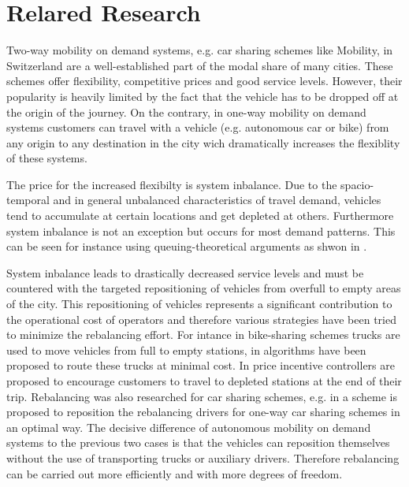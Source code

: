 \section{Relared Research}
\label{subs:literatureResearch}

Two-way mobility on demand systems, e.g. car sharing schemes like Mobility, in
Switzerland \citep{katzev2003car} are a well-established part of the modal share
of many cities. These schemes offer flexibility, competitive prices and good
service levels. However, their popularity is heavily limited by the fact that
the vehicle has to be dropped off at the origin of the journey. On the contrary,
in one-way mobility on demand systems customers can travel with a vehicle (e.g.
autonomous car or bike) from any origin to any destination in the city wich
dramatically increases the flexiblity of these systems.

The price for the increased flexibilty is system inbalance. Due to the
spacio-temporal and in general unbalanced characteristics of travel demand,
vehicles tend to accumulate at certain locations and get depleted at others.
Furthermore system inbalance is not an exception but occurs for most demand
patterns. This can be seen for instance using queuing-theoretical arguments
as shwon in \citep{zhang2016control}.

System inbalance leads to drastically decreased service levels and must be
countered with the targeted repositioning of vehicles from overfull to empty
areas of the city. This repositioning of vehicles represents a significant
contribution to the operational cost of operators and therefore various strategies
have been tried to minimize the rebalancing effort. For intance in bike-sharing
schemes trucks are used to move vehicles from full to empty stations, in
\citep{pfrommer2014dynamic} algorithms have been proposed to route these
trucks at minimal cost. In \citep{ruch2014rule} price incentive controllers
are proposed to encourage customers to travel to depleted stations at the end
of their trip. Rebalancing was also researched for car sharing schemes, e.g.
in \citep{smith2013rebalancing} a scheme is proposed to reposition the
rebalancing drivers for one-way car sharing schemes in an optimal way. The
decisive difference of autonomous mobility on demand systems to the previous two
cases is that the vehicles can reposition themselves without the use of transporting
trucks or auxiliary drivers. Therefore rebalancing can be carried out more efficiently
and with more degrees of freedom.

